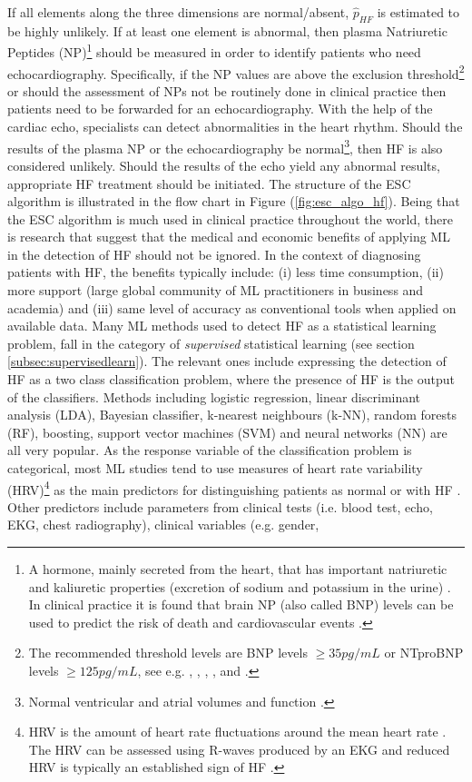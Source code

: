 \documentclass[../thesis.tex]{subfiles}
\begin{document}
\indent If all elements along the three dimensions are normal/absent, $\hat{p}_{HF}$ is estimated to be highly unlikely. If at least one element is abnormal, then plasma Natriuretic Peptides (NP)\footnote{A hormone, mainly secreted from the heart, that has important natriuretic and kaliuretic properties (excretion of sodium and potassium in the urine) \citep{pandit2011natriuretic}. In clinical practice it is found that brain NP (also called BNP) levels can be used to predict the risk of death and cardiovascular events  \citep{wang2004plasma}.} should be measured in order to identify patients who need echocardiography. Specifically, if the NP values are above the exclusion threshold\footnote{The recommended threshold levels are BNP levels $\geq 35 pg/mL$ or NTproBNP levels $\geq 125 pg/mL$, see e.g. \cite{cowie1997value}, \cite{yamamoto2000clinical}, \cite{krishnaswamy2001utility}, \cite{zaphiriou2005diagnostic}, \cite{fuat2006diagnostic} and \cite{maisel2008state}.} or should the assessment of NPs not be routinely done in clinical practice then patients need to be forwarded for an echocardiography. With the help of the cardiac echo, specialists can detect abnormalities in the heart rhythm. Should the results of the plasma NP or the echocardiography be normal\footnote{Normal ventricular and atrial volumes and function \citep{aune2009normal}.}, then HF is also considered unlikely.  Should the results of the echo yield any abnormal results, appropriate HF treatment should be initiated. The structure of the ESC algorithm is illustrated in the flow chart in Figure (\ref{fig:esc_algo_hf}). Being that the ESC algorithm is much used in clinical practice throughout the world, there is research that suggest that the medical and economic benefits of applying ML in the detection of HF should not be ignored. In the context of diagnosing patients with HF, the benefits typically include: (i) less time consumption, (ii) more support (large global community of ML practitioners in business and academia) and (iii) same level of accuracy as conventional tools when applied on available data. Many ML methods used to detect HF as a statistical learning problem, fall in the category of \textit{supervised} statistical learning (see section \ref{subsec:supervisedlearn}). The relevant ones include expressing the detection of HF as a two class classification problem, where the presence of HF is the output of the classifiers. Methods including logistic regression, linear discriminant analysis (LDA), Bayesian classifier, k-nearest neighbours (k-NN), random forests (RF), boosting, support vector machines (SVM) and neural networks (NN) are all very popular. As the response variable of the classification problem is categorical, most ML studies tend to use measures of heart rate variability (HRV)\footnote{HRV is the amount of heart rate fluctuations around the mean heart rate \citep{van1993heart}. The HRV can be assessed using R-waves produced by an EKG and reduced HRV is typically an established sign of HF \citep{ernst2016heart}.} as the main predictors for distinguishing patients as normal or with HF \citep{tripoliti2017heart}. Other predictors include parameters from clinical tests (i.e. blood test, echo, EKG, chest radiography), clinical variables (e.g. gender, 
\end{document}
